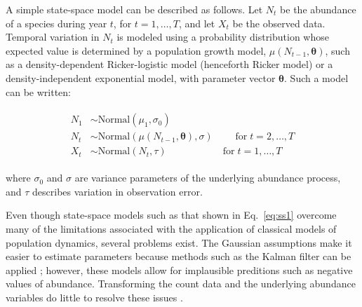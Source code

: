 \documentclass[12pt,english]{article}
\begin{document}
\begin{spacing}{1.9}
\begin{flushleft}
A simple state-space model can be described as follows.
Let $N_t$ be the abundance of a species during year $t$, for
$t=1,\hdots,T$, and let $X_t$ be the observed data. 
Temporal variation in $N_t$ is
modeled using a probability distribution whose expected value is
determined by a population growth model, $\mu(N_{t-1}, {\bm \theta})$, such as 
a density-dependent Ricker-logistic model (henceforth Ricker model) or  
a density-independent exponential model, with parameter vector $\bm
\theta$. Such a model can be written:  
\begin{linenomath*}
\begin{gather}
  \label{eq:ss1}
  \begin{align}
  N_1 &\sim \mathrm{Normal}(\mu_1, \sigma_0) \nonumber \\
  N_t &\sim \mathrm{Normal}(\mu(N_{t-1}, {\bm \theta}), \sigma) \qquad
  \; \text{for} \;  t=2,\hdots,T  \\
  X_t &\sim \mathrm{Normal}(N_t, \tau) \qquad \qquad \quad \;\;\, \text{for} \;  t=1,\hdots,T  \nonumber
  \end{align}
\end{gather}
\end{linenomath*}
where $\sigma_0$ and $\sigma$ are variance parameters of the
underlying abundance process, and $\tau$ describes variation in 
observation error. 

Even though state-space models such as that shown in Eq.~\ref{eq:ss1}
overcome many of the limitations associated with the application of
classical models of population dynamics, several problems exist. 
The Gaussian assumptions 
make it easier to estimate parameters because methods such as the Kalman
filter can be applied \citep{dennis_etal:2006}; however, 
these models allow for implausible preditions such as 
negative values of abundance. 
Transforming the count data and the underlying abundance variables 
do little to resolve these issues \citep{ohara_kotze:2010}.


\end{flushleft}
\end{spacing}
\end{document}
